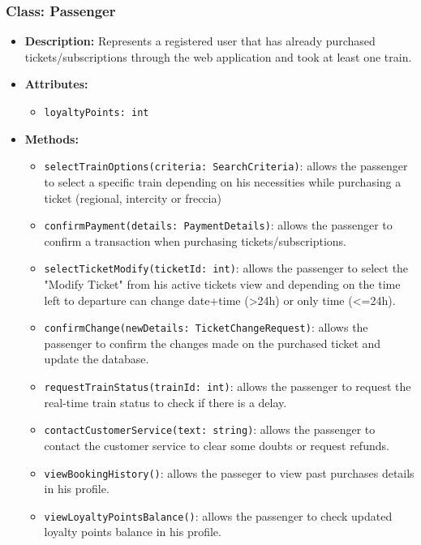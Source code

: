 \documentclass{article}
\begin{document}
\subsubsection*{Class: Passenger}
\begin{itemize}
    \item \textbf{Description:} Represents a registered user that has already purchased tickets/subscriptions through the web application and took at least one train.
    \item \textbf{Attributes:}
    \begin{itemize}
        \item \texttt{loyaltyPoints: int}
    \end{itemize}
    \item \textbf{Methods:}
    \begin{itemize}
        \item \texttt{selectTrainOptions(criteria: SearchCriteria)}: allows the passenger to select a specific train depending on his necessities while purchasing a ticket (regional, intercity or freccia)
        \item \texttt{confirmPayment(details: PaymentDetails)}: allows the passenger to confirm a transaction when purchasing tickets/subscriptions.
        \item \texttt{selectTicketModify(ticketId: int)}: allows the passenger to select the "Modify Ticket" from his active tickets view and depending on the time left to departure can change date+time (>24h) or only time (<=24h).
        \item \texttt{confirmChange(newDetails: TicketChangeRequest)}: allows the passenger to confirm the changes made on the purchased ticket and update the database.
        \item \texttt{requestTrainStatus(trainId: int)}: allows the passenger to request the real-time train status to check if there is a delay.
        \item \texttt{contactCustomerService(text: string)}: allows the passenger to contact the customer service to clear some doubts or request refunds.
        \item \texttt{viewBookingHistory()}: allows the passeger to view past purchases details in his profile.
        \item \texttt{viewLoyaltyPointsBalance()}: allows the passenger to check updated loyalty points balance in his profile.
    \end{itemize}
    \begin{table}[H]
\centering

\end{table}
\end{itemize}
\end{document}
